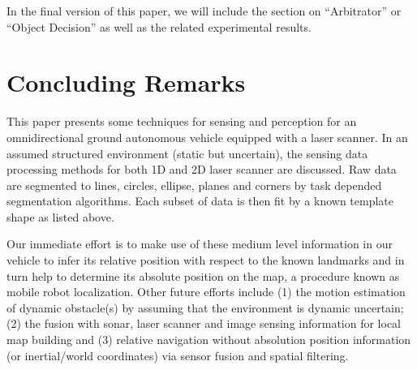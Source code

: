 \documentclass{cdcarta4}
\begin{document}









% 

In the final version of this paper,   we will include the section on ``Arbitrator'' or ``Object Decision'' as well as the related experimental results. 



\section{Concluding Remarks}  
\label{sec6}
   
This paper presents some techniques for sensing and perception for an
omnidirectional ground autonomous vehicle equipped with a laser scanner. In an
assumed structured environment (static but uncertain), the sensing data processing methods for both 1D
and 2D laser scanner are discussed. Raw data are segmented to lines, circles,
ellipse, planes and corners by task depended segmentation algorithms.  Each
subset of data is then fit by a known template shape as listed above.  

Our immediate effort is to make use of these medium level information in our  vehicle to infer its relative position with respect to the known landmarks and in turn help to determine its absolute
position on the map, a procedure known as mobile robot localization.
Other future efforts include (1) the motion estimation of dynamic obstacle(s) by assuming that the environment is dynamic uncertain; (2) the fusion with sonar, laser scanner and image sensing information for local map building and
 (3)  relative navigation  without  absolution position information (or inertial/world coordinates) via sensor fusion and spatial filtering.
\end{document}
